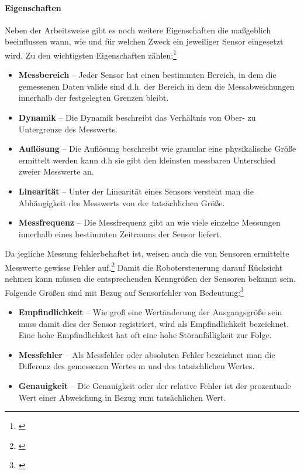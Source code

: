 \paragraph{Eigenschaften}
\color{finishing}
Neben der Arbeitsweise gibt es noch weitere Eigenschaften die maßgeblich beeinflussen wann, wie und für welchen Zweck ein jeweiliger Sensor eingesetzt wird. Zu den wichtigsten Eigenschaften zählen:\footnote{\citep[vgl.][Mobile Roboter, Seite 26 f.]{Hertzberg.MobileRoboter}\label{note7}}
\begin{itemize}
	\item{\textbf{Messbereich}} -- Jeder Sensor hat einen bestimmten Bereich, in dem die gemessenen Daten valide sind d.h. der Bereich in dem die Messabweichungen innerhalb der festgelegten Grenzen bleibt.
	\item{\textbf{Dynamik}} -- Die Dynamik beschreibt das Verhältnis von Ober- zu Untergrenze des Messwerts.
	\item{\textbf{Auflösung}} -- Die Auflösung beschreibt wie granular eine physikalische Größe ermittelt werden kann d.h sie gibt den kleinsten messbaren Unterschied zweier Messwerte an.
	\item{\textbf{Linearität}} -- Unter der Linearität eines Sensors versteht man die Abhängigkeit des Messwerts von der tatsächlichen Größe.
	\item{\textbf{Messfrequenz}} -- Die Messfrequenz gibt an wie viele einzelne Messungen innerhalb eines bestimmten Zeitraums der Sensor liefert.
\end{itemize}
Da jegliche Messung fehlerbehaftet ist, weisen auch die von Sensoren ermittelte Messwerte gewisse Fehler auf.\footnote{\citep[vgl.][Mobile Roboter, Seite 27]{Hertzberg.MobileRoboter}\label{note8}}
\newline
Damit die Robotersteuerung darauf Rücksicht nehmen kann müssen die entsprechenden Kenngrößen der Sensoren bekannt sein. Folgende Größen sind mit Bezug auf Sensorfehler von Bedeutung:\footnote{\citep[vgl.][Mobile Roboter, Seite 27 f.]{Hertzberg.MobileRoboter}\label{note9}}
\begin{itemize}
	\item{\textbf{Empfindlichkeit}} -- Wie groß eine Wertänderung der Ausgangsgröße sein muss damit dies der Sensor registriert, wird als Empfindlichkeit bezeichnet. Eine hohe Empfindlichkeit hat oft eine hohe Störanfälligkeit zur Folge.
	\item{\textbf{Messfehler}} -- Als Messfehler oder absoluten Fehler bezeichnet man die Differenz des gemessenen Wertes m und des tatsächlichen Wertes.
	\item{\textbf{Genauigkeit}} -- Die Genauigkeit oder der relative Fehler ist der prozentuale	Wert einer Abweichung in Bezug zum tatsächlichen Wert.
\end{itemize}
